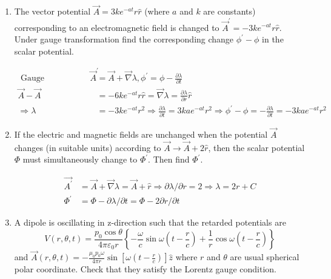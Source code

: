 \begin{enumerate}
	\item The vector potential $\vec{A}=3 k e^{-a t} r \hat{r}$ (where $a$ and $k$ are constants) corresponding to an electromagnetic field is changed to $\vec{A}^{\prime}=-3 k e^{-a t} r \hat{r}$. Under gauge transformation find the corresponding change $\phi^{\prime}-\phi$ in the scalar potential.
	\begin{answer}
		\begin{align*}
		\text { Gauge Transformation } \vec{A}^{\prime}&=\vec{A}+\vec{\nabla} \lambda, \phi^{\prime}=\phi-\frac{\partial \lambda}{\partial t}\\
		\vec{A}-\vec{A}&=-6 k e^{-a t} r \hat{r}=\vec{\nabla} \lambda=\frac{\partial \lambda}{\partial r} \hat{r} \\
		\Rightarrow \lambda&=-3 k e^{-a t} r^{2} \Rightarrow \frac{\partial \lambda}{\partial t}=3 k a e^{-a t} r^{2} \Rightarrow \phi^{\prime}-\phi=-\frac{\partial \lambda}{\partial t}=-3 k a e^{-a t} r^{2}
		\end{align*}
	\end{answer}
	\item If the electric and magnetic fields are unchanged when the potential $\vec{A}$ changes (in suitable units) according to $\vec{A} \rightarrow \vec{A}+2 \hat{r}$, then the scalar potential $\Phi$ must simultaneously change to $\Phi^{\prime}$. Then find $\Phi^{\prime}$.
	\begin{answer}
		\begin{align*}
		\overrightarrow{A^{\prime}}&=\vec{A}+\vec{\nabla} \lambda=\vec{A}+\hat{r} \Rightarrow \partial \lambda / \partial r=2 \Rightarrow \lambda=2 r+C\\
		\Phi^{\prime}&=\Phi-\partial \lambda / \partial t=\Phi-2 \partial r / \partial t
		\end{align*}
	\end{answer}
	\item A dipole is oscillating in z-direction such that the retarded potentials are
	$$
	V(r, \theta, t)=\frac{p_{0} \cos \theta}{4 \pi \varepsilon_{0} r}\left\{-\frac{\omega}{c} \sin \omega\left(t-\frac{r}{c}\right)+\frac{1}{r} \cos \omega\left(t-\frac{r}{c}\right)\right\}
	$$
	and $\vec{A}(r, \theta, t)=-\frac{\mu_{0} p_{0} \omega}{4 \pi r} \sin \left[\omega\left(t-\frac{r}{c}\right)\right] \hat{z}$
	where $r$ and $\theta$ are usual spherical polar coordinate.
	Check that they satisfy the Lorentz gauge condition.
	\begin{answer}
		\begin{align*}

\end{align*}
\end{answer}
\end{enumerate}
